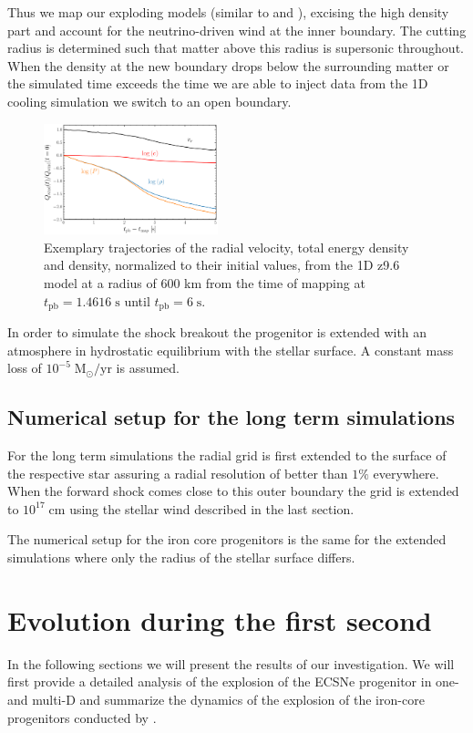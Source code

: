 \documentclass[fleqn,usenatbib]{mnras}
\begin{document}
Thus we map our exploding models (similar to \cite{Wongwathanarat2012} and \cite{Mueller2019}), excising the high density part and account for the neutrino-driven wind at the inner boundary. The cutting radius is determined such that matter above this radius is supersonic throughout. When the density at the new boundary drops below the surrounding matter or the simulated time exceeds the time we are able to inject data from the 1D cooling simulation we switch to an open boundary. 

\begin{figure}
\label{fig:wind}
 \centering
 \includegraphics[width=0.45\textwidth]{./pic/wind.pdf}
 \caption{Exemplary trajectories of the radial velocity, total energy density and  density, normalized to their initial values, from the 1D z9.6 model at a radius of 600 km from the time of mapping at $t_{\mathrm{pb}}= 1.4616\;\mathrm{s}$ until $t_{\mathrm{pb}}= 6\;\mathrm{s}$. }
\end{figure}

In order to simulate the shock breakout the progenitor is extended with an atmosphere in hydrostatic equilibrium with the stellar surface. A constant mass loss of $10^{-5}\;\mathrm{M_{\odot}/yr}$ is assumed. 

\subsection{Numerical setup for the long term simulations}

For the long term simulations the radial grid is first extended to the surface of the respective star assuring a radial resolution of better than $1\%$ everywhere. When the forward shock comes close to this outer boundary the grid is extended to $10^{17}\;\mathrm{cm}$ using the stellar wind described in the last section. 

The numerical setup for the iron core progenitors is the same for the extended simulations where only the radius of the stellar surface differs. 

\section{Evolution during the first second}
In the following sections we will present the results of our investigation. We will first provide a detailed analysis of the explosion of the ECSNe progenitor in one- and multi-D and summarize the dynamics of the explosion of the iron-core progenitors conducted by \cite{Melson2015}. 
\end{document}
